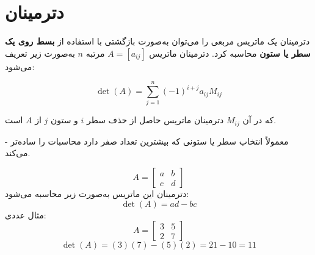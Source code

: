 \section{ دترمینان}
\begin{definition}
	دترمینان یک ماتریس مربعی را می‌توان به‌صورت بازگشتی با استفاده از \textbf{بسط روی یک سطر یا ستون} محاسبه کرد.  
	دترمینان ماتریس \( A = [a_{ij}] \) مرتبه \( n \) به‌صورت زیر تعریف می‌شود:
	
	\[
	\det(A) = \sum_{j=1}^{n} (-1)^{i+j} a_{ij} M_{ij}
	\]
	
	که در آن
 \( M_{ij} \) دترمینان ماتریس حاصل از حذف سطر \( i \) و ستون \( j \) از \( A \) است.
	
\end{definition}
\begin{nokteh}
	- معمولاً انتخاب سطر یا ستونی که بیشترین تعداد صفر دارد محاسبات را ساده‌تر می‌کند.
\end{nokteh}
\begin{example}
	
	\[
	A =
	\begin{bmatrix}
		a & b \\
		c & d
	\end{bmatrix}
	\]
	دترمینان این ماتریس به‌صورت زیر محاسبه می‌شود:
	\[
	\det(A) = ad - bc
	\]
	مثال عددی:
	\[
	A =
	\begin{bmatrix}
		3 & 5 \\
		2 & 7
	\end{bmatrix}
	\]
	\[
	\det(A) = (3)(7) - (5)(2) = 21 - 10 = 11
	\]
\end{example}

